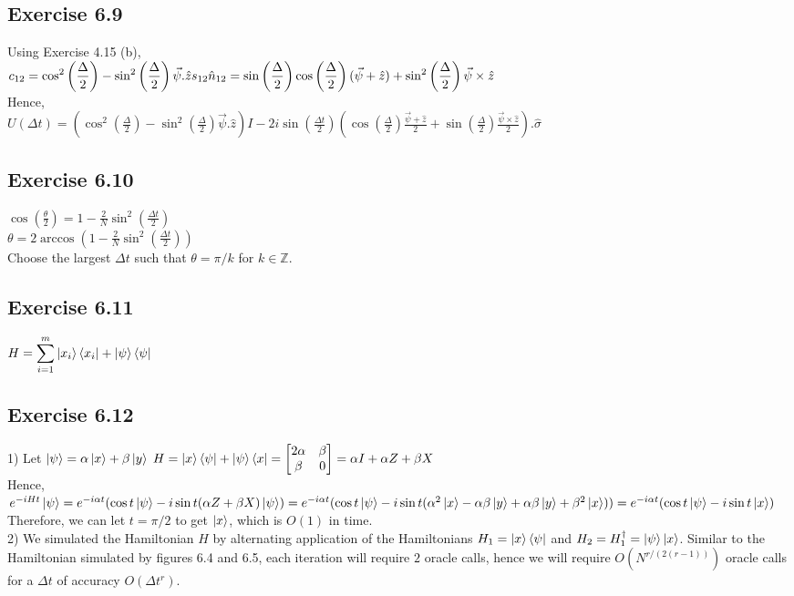 \documentclass[a4paper,12pt]{article}
\begin{document}
\subsection*{Exercise 6.9}
Using Exercise 4.15 (b),\\
$\displaystyle c_{12}=\cos^2\left(\frac{\Delta}{2}\right)-\sin^2\left(\frac{\Delta}{2}\right)\vec{\psi}.\hat{z}\\
\displaystyle s_{12}\hat{n}_{12}=\sin\left(\frac{\Delta}{2}\right)\cos\left(\frac{\Delta}{2}\right)(\vec{\psi}+\hat{z})+
\sin^2\left(\frac{\Delta}{2}\right)\vec{\psi}\times\hat{z}$\\
Hence,\\
$\displaystyle U(\Delta t)=\left(\cos^2\left(\frac{\Delta}{2}\right)-\sin^2\left(\frac{\Delta}{2}\right)\vec{\psi}.\hat{z}\right)I-
2i\sin\left(\frac{\Delta t}{2}\right)\left(\cos\left(\frac{\Delta}{2}\right)\frac{\vec{\psi}+\hat{z}}{2}+
\sin\left(\frac{\Delta}{2}\right)\frac{\vec{\psi}\times\hat{z}}{2}\right).\hat{\sigma}$
\subsection*{Exercise 6.10}
$\displaystyle\cos\left(\frac{\theta}{2}\right)=1-\frac{2}{N}\sin^2\left(\frac{\Delta t}{2}\right)$\\
$\displaystyle\theta=2\arccos\left(1-\frac{2}{N}\sin^2\left(\frac{\Delta t}{2}\right)\right)$\\
Choose the largest $\Delta t$ such that $\theta=\pi/k$ for $k\in\mathbb{Z}$.
\subsection*{Exercise 6.11}
$H=\displaystyle\sum_{i=1}^m\ket{x_i}\bra{x_i}+\ket{\psi}\bra{\psi}$
\subsection*{Exercise 6.12}
1) Let $\ket{\psi}=\alpha\ket{x}+\beta\ket{y}$ 
$H=\ket{x}\bra{\psi}+\ket{\psi}\bra{x}=\begin{bmatrix}
    2\alpha&\beta\\
    \beta&0
\end{bmatrix}=\alpha I+\alpha Z+\beta X$\\
Hence,\\
$e^{-iHt}\ket{\psi}=e^{-i\alpha t}(\cos{t}\ket{\psi}-i\sin{t}(\alpha Z+\beta X)\ket{\psi})=
e^{-i\alpha t}(\cos{t}\ket{\psi}-i\sin{t}(\alpha^2 \ket{x}-\alpha\beta\ket{y}+\alpha\beta\ket{y}+
\beta^2\ket{x}))=e^{-i\alpha t}(\cos{t}\ket{\psi}-i\sin{t}\ket{x})$\\
Therefore, we can let $t=\pi/2$ to get $\ket{x}$, which is $O(1)$ in time.\\
2) We simulated the Hamiltonian $H$ by alternating application of the Hamiltonians
$H_1=\ket{x}\bra{\psi}$ and $H_2=H_1^\dagger =\ket{\psi}\ket{x}$. Similar to the Hamiltonian simulated
by figures 6.4 and 6.5, each iteration will require $2$ oracle calls, hence we will require
$O(N^{r/(2(r-1))})$ oracle calls for a $\Delta t$ of accuracy $O(\Delta t^r)$.
\end{document}
